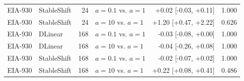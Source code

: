 \begin{longtable}{llrlrr}
EIA-930 & StableShift & 24 & $a=0.1$ vs. $a=1$ & +0.02 [-0.03, +0.11] & 1.000\\
EIA-930 & StableShift & 24 & $a=10$ vs. $a=1$ & +1.20 [+0.47, +2.22] & 0.626\\
EIA-930 & DLinear & 168 & $a=0.1$ vs. $a=1$ & -0.03 [-0.08, +0.00] & 1.000\\
EIA-930 & DLinear & 168 & $a=10$ vs. $a=1$ & -0.04 [-0.26, +0.08] & 1.000\\
EIA-930 & StableShift & 168 & $a=0.1$ vs. $a=1$ & -0.02 [-0.07, +0.02] & 1.000\\
EIA-930 & StableShift & 168 & $a=10$ vs. $a=1$ & +0.22 [+0.08, +0.41] & 0.486\\
\bottomrule
\end{longtable}